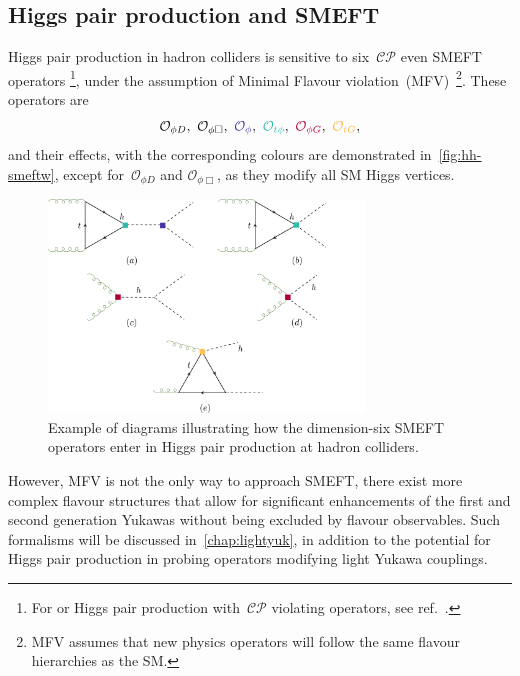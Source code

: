 \subsection{Higgs pair production and SMEFT}
Higgs pair production in hadron colliders is sensitive to six~$\mathcal{CP}$ even SMEFT operators \footnote{For or Higgs pair production with~$\mathcal{CP}$ violating operators, see ref.~\cite{Grober:2017gut}. }, under the assumption of Minimal Flavour violation~(MFV)~\footnote{MFV assumes that new physics operators will follow the same flavour hierarchies as the SM. }. These operators are
	\begin{equation}
	\mathcal{O}_{\phi D},\ \mathcal{O}_{\phi \Box},\ \textcolor[HTML]{4334a0}{\mathcal{O}_{\phi}}, \ 	\textcolor[HTML]{2ebbaa}{\mathcal{O}_{t\phi}}, \ 	\textcolor[HTML]{ae0034}{\mathcal{O}_{\phi G}},\ \textcolor[HTML]{ffb743}{\mathcal{O}_{t G}},
	\label{HH-smeft}
\end{equation}
and their effects, with the corresponding colours are demonstrated in~\autoref{fig:hh-smeftw}, except for~$\mathcal{O}_{\phi D}$ and  $\mathcal{O}_{\phi \Box}$, as they modify all SM Higgs vertices. 
\begin{figure}[t!]
	\begin{center}
			\includegraphics[width=0.75\textwidth]{figures/hh-smeft}
			\caption{ Example of diagrams illustrating how the dimension-six SMEFT operators enter in Higgs pair production at hadron colliders. \label{fig:hh-smeftw} }
		\end{center}
\end{figure}
However, MFV is not the only way to approach SMEFT, there exist more complex flavour structures that allow for significant enhancements of the first and second generation Yukawas without being excluded by flavour observables. Such formalisms will be discussed in~\autoref{chap:lightyuk}, in addition to  the potential for Higgs pair production in probing operators modifying light Yukawa couplings. 
